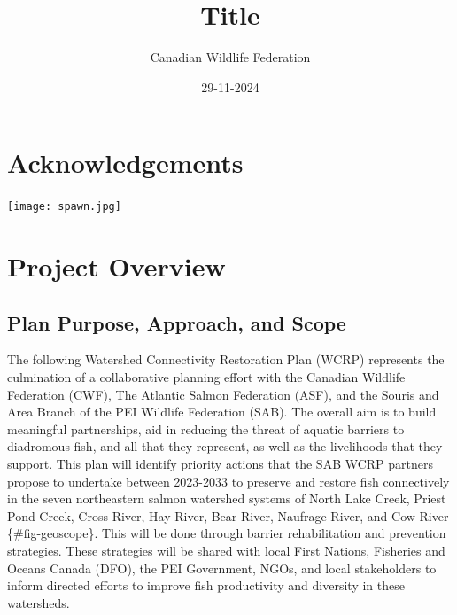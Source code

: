 \documentclass[
  letterpaper,
  DIV=11,
  numbers=noendperiod]{scrreprt}
\title{Title}
\author{Canadian Wildlife Federation}
\date{29-11-2024}
\renewcommand*\contentsname{Table of contents}
\newcommand\contentsname{Table of contents}
\begin{document}
\maketitle

\renewcommand*\contentsname{Table of contents}
{
\hypersetup{linkcolor=}
\setcounter{tocdepth}{1}
\tableofcontents
}


\chapter*{Acknowledgements}\label{acknowledgements}


\texttt{[image: spawn.jpg]}


\chapter*{Project Overview}\label{project-overview}


\section*{Plan Purpose, Approach, and
Scope}\label{plan-purpose-approach-and-scope}


The following Watershed Connectivity Restoration Plan (WCRP) represents
the culmination of a collaborative planning effort with the Canadian
Wildlife Federation (CWF), The Atlantic Salmon Federation (ASF), and the
Souris and Area Branch of the PEI Wildlife Federation (SAB). The overall
aim is to build meaningful partnerships, aid in reducing the threat of
aquatic barriers to diadromous fish, and all that they represent, as
well as the livelihoods that they support. This plan will identify
priority actions that the SAB WCRP partners propose to undertake between
2023-2033 to preserve and restore fish connectively in the seven
northeastern salmon watershed systems of North Lake Creek, Priest Pond
Creek, Cross River, Hay River, Bear River, Naufrage River, and Cow River
\{\#fig-geoscope\}. This will be done through barrier rehabilitation and
prevention strategies. These strategies will be shared with local First
Nations, Fisheries and Oceans Canada (DFO), the PEI Government, NGOs,
and local stakeholders to inform directed efforts to improve fish
productivity and diversity in these watersheds.
\end{document}
